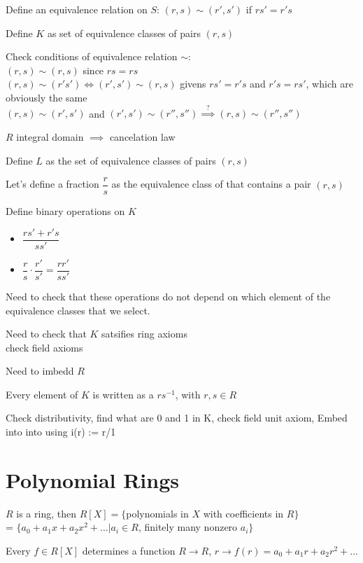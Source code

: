 \documentclass[twoside, 10pt]{article}
\begin{document}
Define an equivalence relation on $S$: $(r, s) \sim (r', s')$ if $rs' = r's$

Define $K$ as set of equivalence classes of pairs $(r, s)$

Check conditions of equivalence relation $\sim$: \\
$(r, s) \sim (r, s)$ since $rs = rs$\\
$(r, s) \sim (r' s') \iff (r', s') \sim (r, s)$ givens $rs' = r's$ and $r's = rs'$, which are obviously the same\\
$(r, s) \sim (r', s')$ and $(r', s') \sim (r'', s'') \stackrel{?}{\implies} (r, s) \sim (r'', s'')$

$R$ integral domain $\implies$ cancelation law

Define $L$ as the set of equivalence classes of pairs $(r, s)$

Let's define a fraction $\dfrac{r}{s}$ as the equivalence class of that contains a pair $(r, s)$

Define binary operations on $K$
\begin{itemize}
    \item $\dfrac{rs' + r's}{ss'}$
    \item $\dfrac{r}{s}\cdot \dfrac{r'}{s'} = \dfrac{rr'}{ss'}$
\end{itemize}
Need to check that these operations do not depend on which element of the equivalence classes that we select. 

Need to check that $K$ satsifies ring axioms\\
check field axioms

Need to imbedd $R$

Every element of $K$ is written as a $rs^{-1}$, with $r,s \in R$

Check distributivity, find what are 0 and 1 in K, check field unit axiom, Embed into into using i(r) := r/1

\section{Polynomial Rings}
\begin{defn}
    $R$ is a ring, then $R[X] = \{$polynomials in $X$ with coefficients in $R\}$\\
    = $\{a_0 + a_1x + a_2x^2 + \ldots | a_i \in R$, finitely many nonzero $a_i\}$
\end{defn}

Every $f\in R[X]$ determines a function $R\to R$, $r \to f(r) = a_0 + a_1r + a_2r^2 + \ldots$
\end{document}
